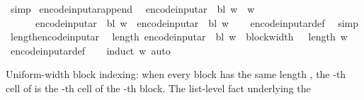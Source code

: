 \begin{isabellebody}
\ simp%
\endisatagproof
{\isafoldproof}%
%
\isadelimproof
\isanewline
%
\endisadelimproof
\isanewline
{}\isamarkupfalse%
\ encode{\isacharunderscore}{\kern0pt}input{\isacharunderscore}{\kern0pt}ar{\isacharunderscore}{\kern0pt}append{\isacharcolon}{\kern0pt}\isanewline
\ \ {\isachardoublequoteopen}encode{\isacharunderscore}{\kern0pt}input{\isacharunderscore}{\kern0pt}ar\ {\isasymGamma}\ bl\ {\isacharparenleft}{\kern0pt}w{}\ {\isacharat}{\kern0pt}\ w{}{\isacharparenright}{\kern0pt}\isanewline
\ \ \ \ \ {\isacharequal}{\kern0pt}\ encode{\isacharunderscore}{\kern0pt}input{\isacharunderscore}{\kern0pt}ar\ {\isasymGamma}\ bl\ w{}\ {\isacharat}{\kern0pt}\ encode{\isacharunderscore}{\kern0pt}input{\isacharunderscore}{\kern0pt}ar\ {\isasymGamma}\ bl\ w{}{\isachardoublequoteclose}\isanewline
%
\isadelimproof
\ \ %
\endisadelimproof
%
\isatagproof
{}\isamarkupfalse%
\ encode{\isacharunderscore}{\kern0pt}input{\isacharunderscore}{\kern0pt}ar{\isacharunderscore}{\kern0pt}def\ \isamarkupfalse%
\ simp%
\endisatagproof
{\isafoldproof}%
%
\isadelimproof
\isanewline
%
\endisadelimproof
\isanewline
{}\isamarkupfalse%
\ length{\isacharunderscore}{\kern0pt}encode{\isacharunderscore}{\kern0pt}input{\isacharunderscore}{\kern0pt}ar{\isacharcolon}{\kern0pt}\isanewline
\ \ {\isachardoublequoteopen}length\ {\isacharparenleft}{\kern0pt}encode{\isacharunderscore}{\kern0pt}input{\isacharunderscore}{\kern0pt}ar\ {\isasymGamma}\ bl\ w{\isacharparenright}{\kern0pt}\ {\isacharequal}{\kern0pt}\ block{\isacharunderscore}{\kern0pt}width\ {\isasymGamma}\ {\isacharasterisk}{\kern0pt}\ length\ w{\isachardoublequoteclose}\isanewline
%
\isadelimproof
\ \ %
\endisadelimproof
%
\isatagproof
{}\isamarkupfalse%
\ encode{\isacharunderscore}{\kern0pt}input{\isacharunderscore}{\kern0pt}ar{\isacharunderscore}{\kern0pt}def\isanewline
\ \ \isamarkupfalse%
\ {\isacharparenleft}{\kern0pt}induct\ w{\isacharparenright}{\kern0pt}\ auto%
\endisatagproof
{\isafoldproof}%
%
\isadelimproof
%
\endisadelimproof
%
\begin{isamarkuptext}%
Uniform-width block indexing: when every block 
  has the same length , the -th cell
  of  is the -th cell of the
  -th block.  The list-level fact underlying the

\end{isamarkuptext}
\end{isabellebody}
